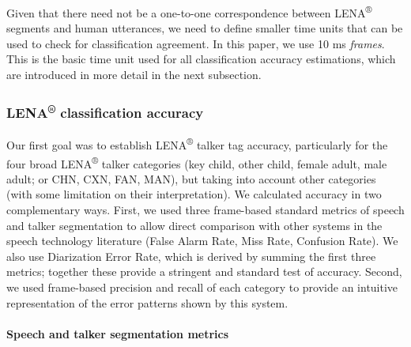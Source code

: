 \documentclass[english,table,man,floatsintext]{apa6}
\let\oldparagraph\paragraph
\renewcommand{\paragraph}[1]{\oldparagraph{#1}\mbox{}}
\begin{document}
Given that there need not be a one-to-one correspondence between LENA\textsuperscript{®} segments and human utterances, we need to define smaller time units that can be used to check for classification agreement. In this paper, we use 10 ms \emph{frames}. This is the basic time unit used for all classification accuracy estimations, which are introduced in more detail in the next subsection.

\hypertarget{lena-classification-accuracy}{%
\subsubsection{\texorpdfstring{LENA\textsuperscript{®} classification accuracy}{LENA® classification accuracy}}\label{lena-classification-accuracy}}

Our first goal was to establish LENA\textsuperscript{®} talker tag accuracy, particularly for the four broad LENA\textsuperscript{®} talker categories (key child, other child, female adult, male adult; or CHN, CXN, FAN, MAN), but taking into account other categories (with some limitation on their interpretation). We calculated accuracy in two complementary ways. First, we used three frame-based standard metrics of speech and talker segmentation to allow direct comparison with other systems in the speech technology literature (False Alarm Rate, Miss Rate, Confusion Rate). We also use Diarization Error Rate, which is derived by summing the first three metrics; together these provide a stringent and standard test of accuracy. Second, we used frame-based precision and recall of each category to provide an intuitive representation of the error patterns shown by this system.

\hypertarget{speech-and-talker-segmentation-metrics}{%
\paragraph{Speech and talker segmentation metrics}\label{speech-and-talker-segmentation-metrics}}
\end{document}
